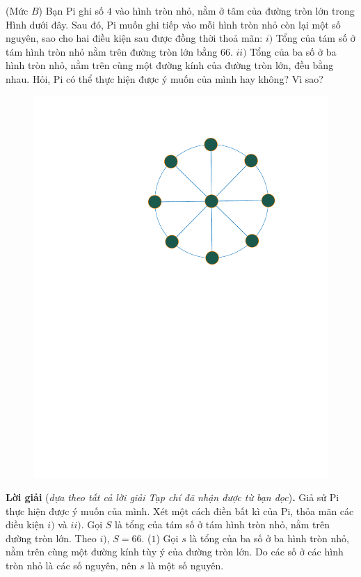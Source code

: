 \begin{multicols}{2}
	\vskip 0.15cm
	{}
	(Mức $B$) Bạn Pi ghi số $4$ vào hình tròn nhỏ, nằm ở tâm của đường tròn lớn trong Hình dưới đây. Sau đó, Pi muốn ghi tiếp vào mỗi hình tròn nhỏ còn lại một số nguyên, sao cho hai điều kiện sau được đồng thời thoả mãn: 
	\vskip 0.05cm
	$i)$ Tổng của tám số ở tám hình tròn nhỏ nằm trên đường tròn lớn bằng $66$. 
	\vskip 0.05cm
	$ii)$ Tổng của ba số ở ba hình tròn nhỏ, nằm trên cùng một đường kính của đường tròn lớn, đều bằng nhau. 
	\vskip 0.05cm
	Hỏi, Pi có thể thực hiện được ý muốn của mình hay không? Vì sao?
	\begin{figure}[H]
		\centering
		\vspace*{-10pt}
		\captionsetup{labelformat= empty, justification=centering}
		\includegraphics[width=0.65\linewidth]{P634}
		\vspace*{-10pt}
	\end{figure}
	\textbf{\color{thachthuctoanhoc}Lời giải} (\textit{dựa theo tất cả lời giải Tạp chí đã nhận được từ bạn đọc})\textbf{\color{thachthuctoanhoc}.}
	\vskip 0.05cm
	Giả sử Pi thực hiện được ý muốn của mình.
	\vskip 0.05cm
	Xét một cách điền bất kì của Pi, thỏa mãn các điều kiện $i)$ và $ii)$.
	\vskip 0.05cm
	Gọi $S$ là tổng của tám số ở tám hình tròn nhỏ, nằm trên đường tròn lớn. Theo $i)$, \linebreak $S = 66$.       \hfill              ($1$)
	\vskip 0.05cm
	Gọi $s$ là tổng của ba số ở ba hình tròn nhỏ, nằm trên cùng một đường kính tùy ý của đường tròn lớn. Do các số ở các hình tròn nhỏ là các số nguyên, nên $s$ là một số nguyên.

\end{multicols}
